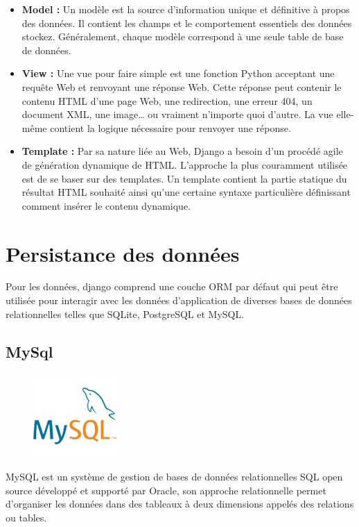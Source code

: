 \begin{itemize}
    \item[\textbullet] \textbf{Model :} Un modèle est la source d’information unique 
        et définitive à propos des données. Il contient les champs et le comportement 
        essentiels des données stockez. Généralement, chaque modèle correspond à une 
        seule table de base de données\cite{19}.
    \item[\textbullet] \textbf{View :} Une vue pour faire simple est une fonction 
        Python acceptant une requête Web et renvoyant une réponse Web. Cette réponse 
        peut contenir le contenu HTML d’une page Web, une redirection, une erreur 404, 
        un document XML, une image… ou vraiment n’importe quoi d’autre. La vue 
        elle-même contient la logique nécessaire pour renvoyer une réponse\cite{20}.
    \item[\textbullet] \textbf{Template :} Par sa nature liée au Web, Django a 
        besoin d’un procédé agile de génération dynamique de HTML. L’approche la plus 
        couramment utilisée est de se baser sur des templates. Un template contient la 
        partie statique du résultat HTML souhaité ainsi qu’une certaine syntaxe 
        particulière définissant comment insérer le contenu dynamique\cite{21}.
\end{itemize}
    
\section{Persistance des données}
Pour les données, django comprend une couche ORM par défaut qui peut être 
utilisée pour interagir avec les données d'application de diverses bases de 
données relationnelles telles que SQLite, PostgreSQL et MySQL.

\subsection{MySql}
    \begin{figure}
        \vspace{-22pt}
        \begin{center}
            \includegraphics[scale=0.36]{images/logo/mysql.png}
            \label{fig76}
        \end{center}
        \vspace{-20pt}
        \vspace{-10pt}
    \end{figure}
MySQL est un système de gestion de bases de données relationnelles SQL open 
source développé et supporté par Oracle, son approche relationnelle permet 
d'organiser les données dans des tableaux à deux dimensions appelés des 
relations ou tables\cite{47}.
        

